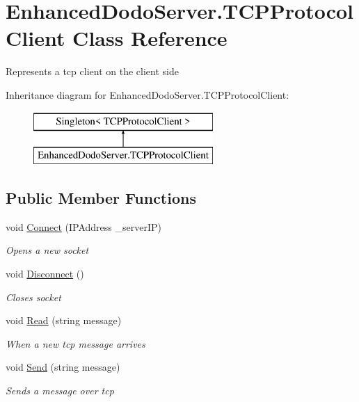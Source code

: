 \hypertarget{class_enhanced_dodo_server_1_1_t_c_p_protocol_client}{}\section{Enhanced\+Dodo\+Server.\+T\+C\+P\+Protocol\+Client Class Reference}
\label{class_enhanced_dodo_server_1_1_t_c_p_protocol_client}


Represents a tcp client on the client side  


Inheritance diagram for Enhanced\+Dodo\+Server.\+T\+C\+P\+Protocol\+Client\+:\begin{figure}[H]
\begin{center}
\leavevmode
\includegraphics[height=2.000000cm]{class_enhanced_dodo_server_1_1_t_c_p_protocol_client}
\end{center}
\end{figure}
\subsection*{Public Member Functions}
\begin{DoxyCompactItemize}
\item 
void \mbox{\hyperlink{class_enhanced_dodo_server_1_1_t_c_p_protocol_client_a4ac4ec505a2a7a9ca24b0b4c11f7ed61}{Connect}} (I\+P\+Address \+\_\+server\+IP)
\begin{DoxyCompactList}\small\item\em Opens a new socket \end{DoxyCompactList}\item 
void \mbox{\hyperlink{class_enhanced_dodo_server_1_1_t_c_p_protocol_client_ad87c3b6bfb3488eec6cd90da69eed8c1}{Disconnect}} ()
\begin{DoxyCompactList}\small\item\em Closes socket \end{DoxyCompactList}\item 
void \mbox{\hyperlink{class_enhanced_dodo_server_1_1_t_c_p_protocol_client_aaee4b29c918db49c59c41f55c948bdb7}{Read}} (string message)
\begin{DoxyCompactList}\small\item\em When a new tcp message arrives \end{DoxyCompactList}\item 
void \mbox{\hyperlink{class_enhanced_dodo_server_1_1_t_c_p_protocol_client_a2e6ac33cb9240b578ce4ba80624a8fa1}{Send}} (string message)
\begin{DoxyCompactList}\small\item\em Sends a message over tcp \end{DoxyCompactList}\end{DoxyCompactItemize}


